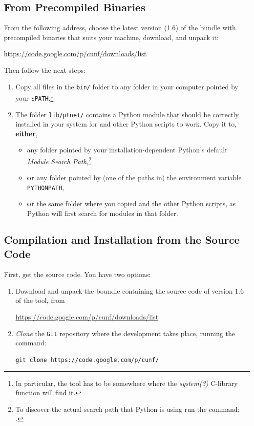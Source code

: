 \documentclass[a4paper]{refart}
\begin{document}
\subsection{From Precompiled Binaries}
\label{s:precompiled}

From the following address, choose the latest version (1.6) of the bundle
with precompiled binaries that suits your machine,
download, and unpack it:
\begin{center}
\url{https://code.google.com/p/cunf/downloads/list}
\end{center}
Then follow the next steps:
\begin{enumerate}
\item
  Copy all files in the \verb!bin/! folder to any folder in your
  computer pointed by your \verb!$PATH!.\footnote{In particular, the \minisat
  tool has to be somewhere where the \textit{system(3)} C-library function
  will find it.}
\item
  The folder \verb!lib/ptnet/! contains a Python module that should be
  correctly installed in your system for \cna and other Python scripts
  to work.
  Copy it to, \textbf{either},
  \begin{itemize}
  \item
    any folder pointed by your installation-dependent Python's default
    \textit{Module Search Path},\footnote{To discover the actual search
    path that Python is using run the command: \\
    .}
  \item
    \textbf{or} any folder pointed by (one of the paths in) the
    environment variable \verb!PYTHONPATH!,
  \item
    \textbf{or} the same folder where you copied \cna and the other Python
    scripts, as Python will first search for modules in that folder.
  \end{itemize}
\end{enumerate}

\subsection{Compilation and Installation from the Source Code}
\label{s:compilation}

First, get the source code.  You have two options:
\begin{enumerate}
\item
  Download and unpack the boundle containing the source code of version 1.6 of
  the tool, from
  \begin{center}
  \url{https://code.google.com/p/cunf/downloads/list}
  \end{center}
\item
  \textit{Clone} the \verb!Git! repository where the development takes place,
  running the command:
  \begin{center}
  \verb!git clone https://code.google.com/p/cunf/!
  \end{center}
\end{enumerate}
\end{document}
